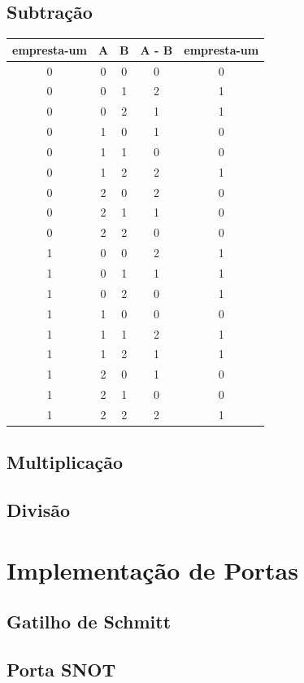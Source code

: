 \documentclass[12pt]{article}
\begin{document}
\subsection{Subtração}
\centering
\begin{tabular}{|c|c|c|c|c|}
	\hline
	empresta-um & \textbf{A} & \textbf{B} & \textbf{A} - \textbf{B}& empresta-um \\\hline
	0 & 0 & 0 & 0 & 0 \\\hline
	0 & 0 & 1 & 2 & 1 \\\hline
	0 & 0 & 2 & 1 & 1 \\\hline
	0 & 1 & 0 & 1 & 0 \\\hline
	0 & 1 & 1 & 0 & 0 \\\hline
	0 & 1 & 2 & 2 & 1 \\\hline
	0 & 2 & 0 & 2 & 0 \\\hline
	0 & 2 & 1 & 1 & 0 \\\hline
	0 & 2 & 2 & 0 & 0 \\\hline
	1 & 0 & 0 & 2 & 1 \\\hline
	1 & 0 & 1 & 1 & 1 \\\hline
	1 & 0 & 2 & 0 & 1 \\\hline
	1 & 1 & 0 & 0 & 0 \\\hline
	1 & 1 & 1 & 2 & 1 \\\hline
	1 & 1 & 2 & 1 & 1 \\\hline
	1 & 2 & 0 & 1 & 0 \\\hline
	1 & 2 & 1 & 0 & 0 \\\hline
	1 & 2 & 2 & 2 & 1 \\\hline
\end{tabular}
\subsection{Multiplicação}

\subsection{Divisão}

\section{Implementação de Portas}
\subsection{Gatilho de Schmitt}

\subsection{Porta SNOT}
\end{document}
